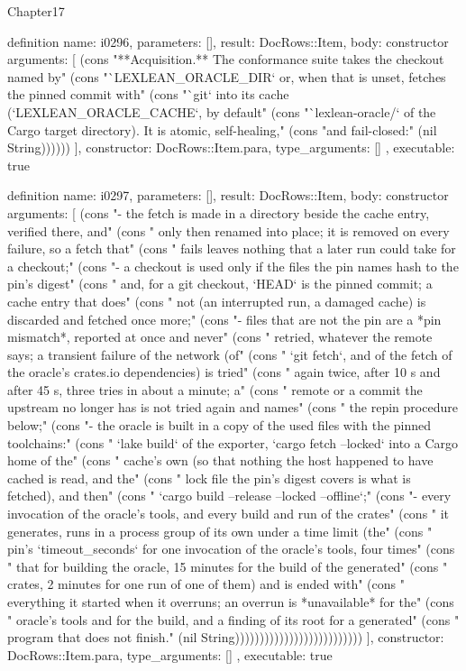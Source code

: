\begin{lexlean}{Chapter17}
\begin{semanticmodule}
definition{
  name: i0296,
  parameters: [],
  result: DocRows::Item,
  body: constructor{
    arguments: [
      (cons "**Acquisition.** The conformance suite takes the checkout named by" (cons "`LEXLEAN_ORACLE_DIR` or, when that is unset, fetches the pinned commit with" (cons "`git` into its cache (`LEXLEAN_ORACLE_CACHE`, by default" (cons "`lexlean-oracle/` of the Cargo target directory). It is atomic, self-healing," (cons "and fail-closed:" (nil String))))))
    ],
    constructor: DocRows::Item.para,
    type_arguments: []
  },
  executable: true
}

definition{
  name: i0297,
  parameters: [],
  result: DocRows::Item,
  body: constructor{
    arguments: [
      (cons "- the fetch is made in a directory beside the cache entry, verified there, and" (cons "  only then renamed into place; it is removed on every failure, so a fetch that" (cons "  fails leaves nothing that a later run could take for a checkout;" (cons "- a checkout is used only if the files the pin names hash to the pin's digest" (cons "  and, for a git checkout, `HEAD` is the pinned commit; a cache entry that does" (cons "  not (an interrupted run, a damaged cache) is discarded and fetched once more;" (cons "- files that are not the pin are a *pin mismatch*, reported at once and never" (cons "  retried, whatever the remote says; a transient failure of the network (of" (cons "  `git fetch`, and of the fetch of the oracle's crates.io dependencies) is tried" (cons "  again twice, after 10 s and after 45 s, three tries in about a minute; a" (cons "  remote or a commit the upstream no longer has is not tried again and names" (cons "  the repin procedure below;" (cons "- the oracle is built in a copy of the used files with the pinned toolchains:" (cons "  `lake build` of the exporter, `cargo fetch --locked` into a Cargo home of the" (cons "  cache's own (so that nothing the host happened to have cached is read, and the" (cons "  lock file the pin's digest covers is what is fetched), and then" (cons "  `cargo build --release --locked --offline`;" (cons "- every invocation of the oracle's tools, and every build and run of the crates" (cons "  it generates, runs in a process group of its own under a time limit (the" (cons "  pin's `timeout_seconds` for one invocation of the oracle's tools, four times" (cons "  that for building the oracle, 15 minutes for the build of the generated" (cons "  crates, 2 minutes for one run of one of them) and is ended with" (cons "  everything it started when it overruns; an overrun is *unavailable* for the" (cons "  oracle's tools and for the build, and a finding of its root for a generated" (cons "  program that does not finish." (nil String))))))))))))))))))))))))))
    ],
    constructor: DocRows::Item.para,
    type_arguments: []
  },
  executable: true
}


\end{semanticmodule}
\end{lexlean}
